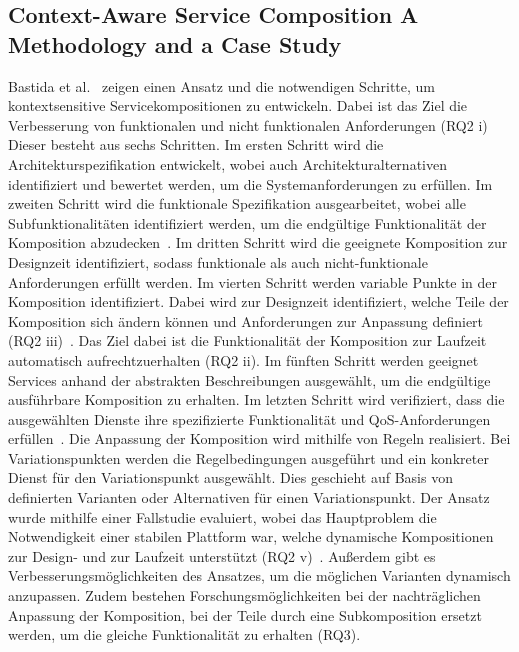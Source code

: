 \documentclass[conference,compsoc]{IEEEtran}
\begin{document}
\subsection{Context-Aware Service Composition  A Methodology and a Case Study}
Bastida et al.~\cite{bastida2008context} zeigen einen Ansatz und die notwendigen Schritte, um kontextsensitive Servicekompositionen zu entwickeln. Dabei ist das Ziel die Verbesserung von funktionalen und nicht funktionalen Anforderungen (RQ2 i) Dieser besteht aus sechs Schritten. Im ersten Schritt wird die Architekturspezifikation entwickelt, wobei auch Architekturalternativen identifiziert und bewertet werden, um die Systemanforderungen zu erfüllen. Im zweiten Schritt wird die funktionale Spezifikation ausgearbeitet, wobei alle Subfunktionalitäten identifiziert werden, um die endgültige Funktionalität der Komposition abzudecken~\cite{bastida2008context}. Im dritten Schritt wird die geeignete Komposition zur Designzeit identifiziert, sodass funktionale als auch nicht-funktionale Anforderungen erfüllt werden. Im vierten Schritt werden variable Punkte in der Komposition identifiziert. Dabei wird zur Designzeit identifiziert, welche Teile der Komposition sich ändern können und Anforderungen zur Anpassung definiert (RQ2 iii)~\cite{bastida2008context}. Das Ziel dabei ist die Funktionalität der Komposition zur Laufzeit automatisch aufrechtzuerhalten (RQ2 ii). Im fünften Schritt werden geeignet Services anhand der abstrakten Beschreibungen ausgewählt, um die endgültige ausführbare Komposition zu erhalten. Im letzten Schritt wird verifiziert, dass die ausgewählten Dienste ihre spezifizierte Funktionalität und QoS-Anforderungen erfüllen~\cite{bastida2008context}.
Die Anpassung der Komposition wird mithilfe von Regeln realisiert. Bei Variationspunkten werden die Regelbedingungen ausgeführt und ein konkreter Dienst für den Variationspunkt ausgewählt. Dies geschieht auf Basis von definierten Varianten oder Alternativen für einen Variationspunkt.
Der Ansatz wurde mithilfe einer Fallstudie evaluiert, wobei das Hauptproblem die Notwendigkeit einer stabilen Plattform war, welche dynamische Kompositionen zur Design- und zur Laufzeit unterstützt (RQ2 v)~\cite{bastida2008context}. Außerdem gibt es Verbesserungsmöglichkeiten des Ansatzes, um die möglichen Varianten dynamisch anzupassen. Zudem bestehen Forschungsmöglichkeiten bei der nachträglichen Anpassung der Komposition, bei der Teile durch eine Subkomposition ersetzt werden, um die gleiche Funktionalität zu erhalten (RQ3).
\end{document}
